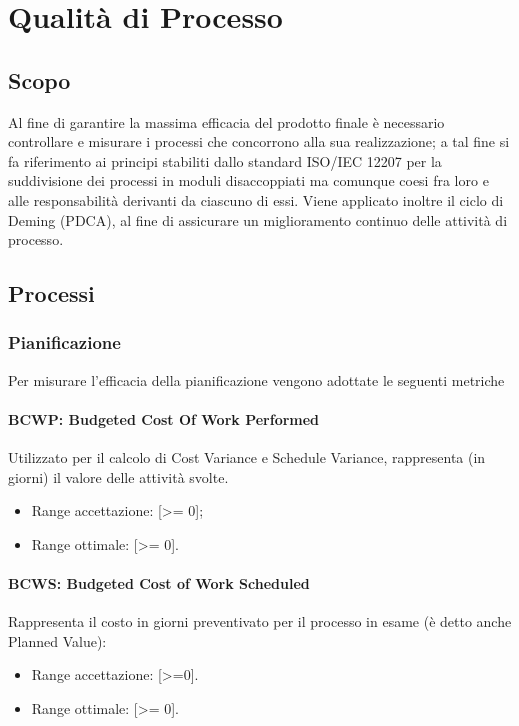 \chapter{Qualità di Processo}
\label{processo} 
\section{Scopo}
Al fine di garantire la massima efficacia del prodotto finale è necessario controllare e misurare i processi che concorrono alla sua realizzazione; a tal fine si fa riferimento ai principi stabiliti dallo standard ISO/IEC 12207 per la suddivisione dei processi in moduli disaccoppiati ma comunque coesi fra loro e alle responsabilità derivanti da ciascuno di essi.
Viene applicato inoltre il ciclo di Deming (PDCA), al fine di assicurare un miglioramento continuo delle attività di processo. 

\section{Processi}

\subsection{Pianificazione}
Per misurare l'efficacia della pianificazione vengono adottate le seguenti metriche 

\subsubsection{BCWP: Budgeted Cost Of Work Performed}\label{bcwp}
Utilizzato per il calcolo di Cost Variance e Schedule Variance, rappresenta (in giorni) il valore delle attività svolte.
\begin{itemize}
	\item Range accettazione: [>= 0];
	\item Range ottimale: [>= 0].
\end{itemize}
\subsubsection{BCWS: Budgeted Cost of Work Scheduled}\label{bcws}
Rappresenta il costo in giorni preventivato per il processo in esame (è detto anche Planned Value):
\begin{itemize}
\item Range accettazione: [>=0].
\item Range ottimale: [>= 0].
\end{itemize}

